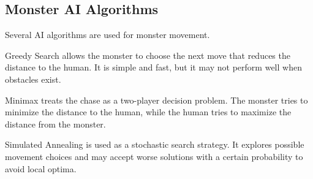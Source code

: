 \subsection{Monster AI Algorithms}

Several AI algorithms are used for monster movement.

Greedy Search allows the monster to choose the next move that reduces the distance to the human. It is simple and fast, but it may not perform well when obstacles exist.



Minimax treats the chase as a two-player decision problem. The monster tries to minimize the distance to the human, while the human tries to maximize the distance from the monster.

Simulated Annealing is used as a stochastic search strategy. It explores possible movement choices and may accept worse solutions with a certain probability to avoid local optima.
